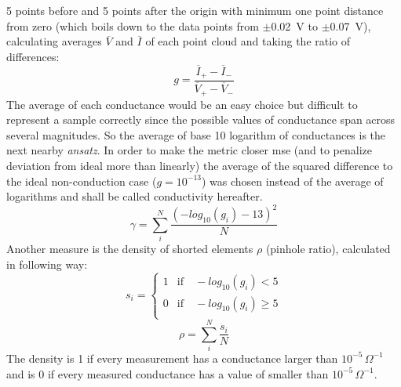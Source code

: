5 points before and 5 points after the origin with minimum one point distance from zero (which boils
down to the data points from $\pm$\SI{0.02}{\volt} to $\pm$\SI{0.07}{\volt}), 
calculating averages $\overline{V}$ and $\overline{I}$ of each point cloud and taking the ratio of differences:
\begin{equation}
    g = \frac{\overline{I}_{+} - \overline{I}_-}{\overline{V}_{+} - \overline{V}_-}
\end{equation}
%
The average of each conductance would be an easy choice but difficult to represent a 
sample correctly since the possible values of conductance span across several magnitudes.
So the average of base 10 logarithm of conductances is the next nearby \textit{ansatz}.
%
In order to make the metric closer 
\gls{mse} (and to penalize deviation from ideal more than linearly) the average of the squared difference 
to the ideal non-conduction case ($g=10^{-13}$) was chosen instead of the average of logarithms and shall be called conductivity hereafter. %
%
\begin{equation}
    \gamma = \sum_i^N \frac{ (-log_{10}(g_i) - 13)^2}{N}
	\label{eq:gamma}
\end{equation}
Another measure is the density of shorted elements $\rho$ (pinhole ratio), calculated in following way:
\begin{equation}
	s_i = \begin{cases}
        1 &\text{if} \quad -log_{10}(g_i) < 5 \\
        0 &\text{if} \quad -log_{10}(g_i) \geq 5 \\
	\end{cases}
\end{equation}
\begin{equation}
	\rho = \sum_i^N \frac{s_i}{N}
	\label{eq:rho}
\end{equation}
The density is 1 if every measurement has a conductance larger than $10^{-5} \, \Omega^{-1}$ and is 0 if every measured conductance has a value of smaller than $10^{-5} \, \Omega^{-1}$.
%


